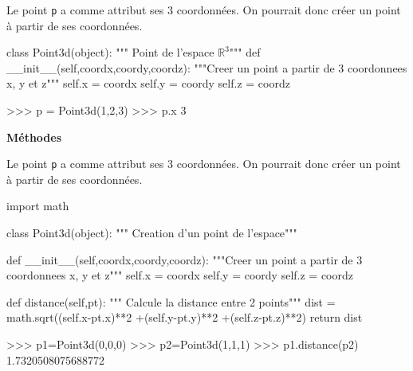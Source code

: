 \documentclass[11pt,oneside]{article}
\begin{document}
\begin{exemple}

Le point \texttt{p} a comme attribut ses 3 coordonnées. On pourrait donc créer un point à partir de ses coordonnées.

\begin{minipage}[c]{.9\linewidth}
\begin{py}
\begin{python}
class Point3d(object):
    """ Point de l'espace $\mathbb{R}^3$"""
    def __init__(self,coordx,coordy,coordz):
        """Creer un point a partir de 3 coordonnees x, y et z"""
        self.x = coordx
        self.y = coordy
        self.z = coordz

>>> p = Point3d(1,2,3)
>>> p.x
	3
\end{python}
\end{py}
\end{minipage}
\end{exemple}

\begin{defi}
\textbf{Méthodes}


\end{defi}


\begin{exemple}

Le point \texttt{p} a comme attribut ses 3 coordonnées. On pourrait donc créer un point à partir de ses coordonnées.

\begin{minipage}[c]{.9\linewidth}
\begin{py}
\begin{python}
import math

class Point3d(object):
    """ Creation d'un point de l'espace"""

    def __init__(self,coordx,coordy,coordz):
        """Creer un point a partir de 3 coordonnees x, y et z"""
        self.x = coordx
        self.y = coordy
        self.z = coordz

    def distance(self,pt):
        """ Calcule la distance entre 2 points"""
        dist = math.sqrt((self.x-pt.x)**2
                         +(self.y-pt.y)**2
                         +(self.z-pt.z)**2)
        return dist
    
>>> p1=Point3d(0,0,0)
>>> p2=Point3d(1,1,1)
>>> p1.distance(p2)
	1.7320508075688772
\end{python}
\end{py}
\end{minipage}
\end{exemple}

\begin{thebibliography}{2}

\end{thebibliography}
\end{document}
